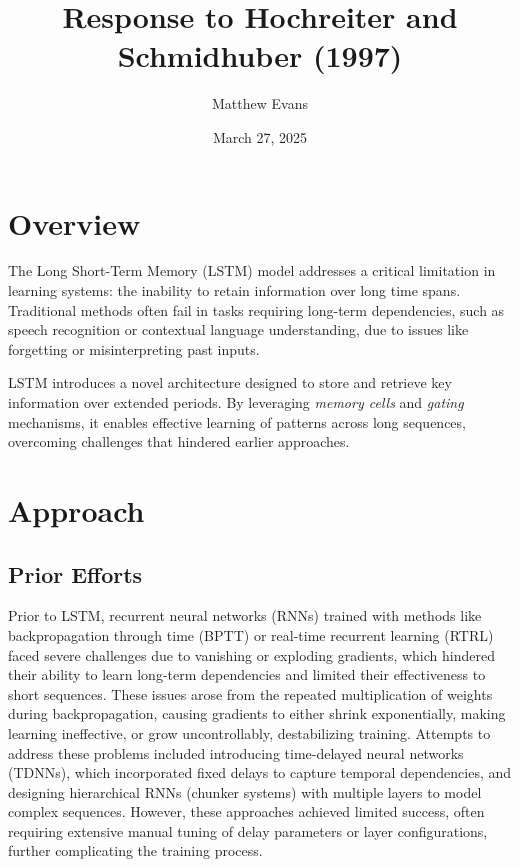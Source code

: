 \documentclass[10pt]{article}
\title{
    Response to Hochreiter and Schmidhuber (1997) \\
}
\author{Matthew Evans}
\date{March 27, 2025}
\begin{document}
\maketitle

\section*{Overview}

The Long Short-Term Memory (LSTM)\cite{6795963} model addresses a critical limitation in learning systems: the inability to retain information over long time spans. Traditional methods often fail in tasks requiring long-term dependencies, such as speech recognition or contextual language understanding, due to issues like forgetting or misinterpreting past inputs.

LSTM introduces a novel architecture designed to store and retrieve key information over extended periods. By leveraging \textit{memory cells} and \textit{gating} mechanisms, it enables effective learning of patterns across long sequences, overcoming challenges that hindered earlier approaches.


\section*{Approach}

\subsection*{Prior Efforts}

Prior to LSTM, recurrent neural networks (RNNs) trained with methods like backpropagation through time (BPTT) or real-time recurrent learning (RTRL) faced severe challenges due to vanishing or exploding gradients, which hindered their ability to learn long-term dependencies and limited their effectiveness to short sequences. These issues arose from the repeated multiplication of weights during backpropagation, causing gradients to either shrink exponentially, making learning ineffective, or grow uncontrollably, destabilizing training. Attempts to address these problems included introducing time-delayed neural networks (TDNNs)\cite{LANG199023}, which incorporated fixed delays to capture temporal dependencies, and designing hierarchical RNNs (chunker systems)\cite{6795261} with multiple layers to model complex sequences. However, these approaches achieved limited success, often requiring extensive manual tuning of delay parameters or layer configurations, further complicating the training process.
\end{document}
